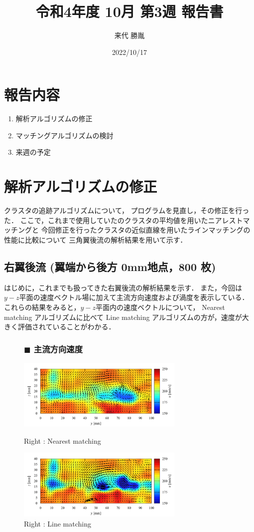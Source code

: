 \documentclass[twocolumn,a4j]{jsarticle}
\author{来代 勝胤}
\title{令和4年度 10月 第3週 報告書}
\date{2022/10/17}
\begin{document}
\columnseprule=0.1mm
\maketitle

\section*{報告内容}
\begin{enumerate}[1.]
  \item 解析アルゴリズムの修正
  \item マッチングアルゴリズムの検討
  \item 来週の予定
\end{enumerate}

\section{解析アルゴリズムの修正}
クラスタの追跡アルゴリズムについて，
プログラムを見直し，その修正を行った．
ここで，これまで使用していたのクラスタの平均値を用いたニアレストマッチングと
今回修正を行ったクラスタの近似直線を用いたラインマッチングの性能に比較について
三角翼後流の解析結果を用いて示す．\\

\subsection{右翼後流 (翼端から後方 0mm地点，800 枚)}
はじめに，これまでも扱ってきた右翼後流の解析結果を示す．
また，今回は$y-z$平面の速度ベクトル場に加えて主流方向速度および渦度を表示している．
これらの結果をみると，$y-z$平面内の速度ベクトルについて，
Nearest matching アルゴリズムに比べて
Line matching アルゴリズムの方が，速度が大きく評価されていることがわかる．

\begin{figure}[htbp]
  \subsubsection*{$\blacksquare$ 主流方向速度}
  \centering
  \includegraphics[keepaspectratio, width=80mm]{../images/vel_n_R.png}
  \caption{Right : Nearest matching}
  \includegraphics[keepaspectratio, width=80mm]{../images/vel_l_R.png}
  \caption{Right : Line matching}
\end{figure}
\end{document}
